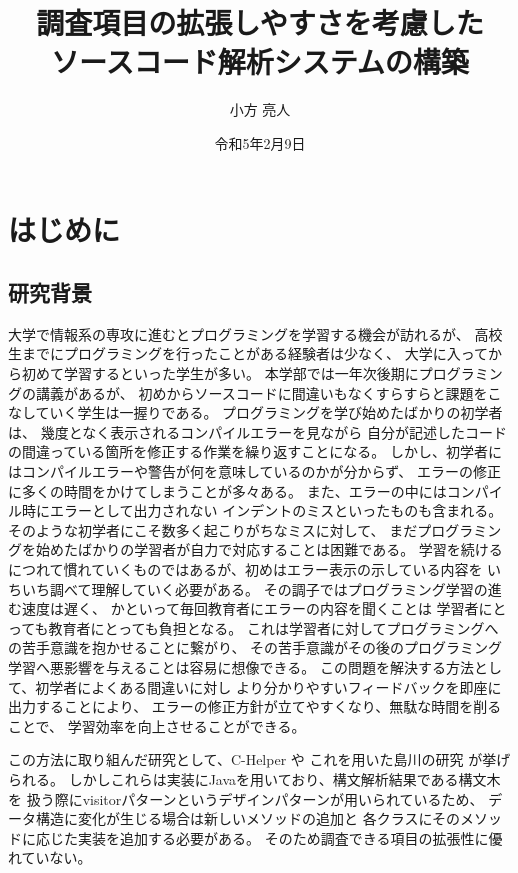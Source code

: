 \documentclass{csspaper}
\title {調査項目の拡張しやすさを考慮した\\ソースコード解析システムの構築}
\author{小方 亮人}
\date{令和5年2月9日}
\begin{document}
\maketitle

   \chapter{はじめに}
      \section{研究背景}
      大学で情報系の専攻に進むとプログラミングを学習する機会が訪れるが、
      高校生までにプログラミングを行ったことがある経験者は少なく、
      大学に入ってから初めて学習するといった学生が多い。
      本学部では一年次後期にプログラミングの講義があるが、
      初めからソースコードに間違いもなくすらすらと課題をこなしていく学生は一握りである。
      プログラミングを学び始めたばかりの初学者は、
      幾度となく表示されるコンパイルエラーを見ながら
      自分が記述したコードの間違っている箇所を修正する作業を繰り返すことになる。
      しかし、初学者にはコンパイルエラーや警告が何を意味しているのかが分からず、
      エラーの修正に多くの時間をかけてしまうことが多々ある。
      また、エラーの中にはコンパイル時にエラーとして出力されない
      インデントのミスといったものも含まれる。
      そのような初学者にこそ数多く起こりがちなミスに対して、
      まだプログラミングを始めたばかりの学習者が自力で対応することは困難である。
      学習を続けるにつれて慣れていくものではあるが、初めはエラー表示の示している内容を
      いちいち調べて理解していく必要がある。
      その調子ではプログラミング学習の進む速度は遅く、
      かといって毎回教育者にエラーの内容を聞くことは
      学習者にとっても教育者にとっても負担となる。
      これは学習者に対してプログラミングへの苦手意識を抱かせることに繋がり、
      その苦手意識がその後のプログラミング学習へ悪影響を与えることは容易に想像できる。
      この問題を解決する方法として、初学者によくある間違いに対し
      より分かりやすいフィードバックを即座に出力することにより、
      エラーの修正方針が立てやすくなり、無駄な時間を削ることで、
      学習効率を向上させることができる。

      この方法に取り組んだ研究として、C-Helper \cite{1,2,3}や
      これを用いた島川の研究 \cite{4}が挙げられる。
      しかしこれらは実装にJavaを用いており、構文解析結果である構文木を
      扱う際にvisitorパターンというデザインパターンが用いられているため、
      データ構造に変化が生じる場合は新しいメソッドの追加と
      各クラスにそのメソッドに応じた実装を追加する必要がある。
      そのため調査できる項目の拡張性に優れていない。
\end{document}

